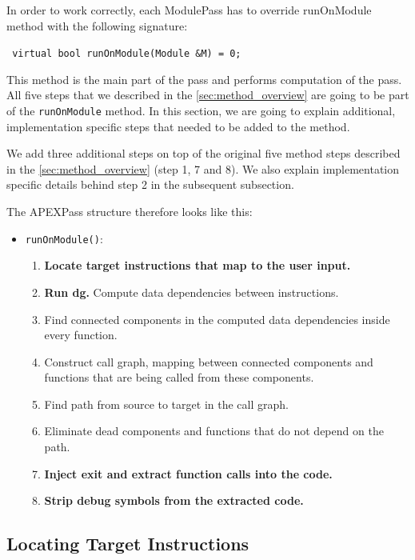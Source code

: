 \documentclass[12pt, twoside]{fithesis2}
\renewcommand{\_}{\leavevmode \kern0.07em\vbox{\hrule width0.4em}}
\newcommand{\squarebullet}{\textcolor{black}{\raisebox{0.15em}{\rule{4pt}{4pt}}}}
\newenvironment{myItemize}{
  \begin{itemize}[
    leftmargin=2em,
    rightmargin=1em,
    itemsep=\parskip,
    parsep=0em,
    topsep=0em,
    partopsep=0em
]
  \renewcommand{\labelitemi}{\squarebullet}
  \renewcommand{\labelitemii}{\textbullet}
}{
  \end{itemize}
}
\newenvironment{myEnumerate}{
  \begin{enumerate}[
    leftmargin=2em,
    rightmargin=1em,
    itemsep=\parskip,
    parsep=0em,
    topsep=0em,
    partopsep=0em
]
}{
  \end{enumerate}
}
\begin{document}
In order to work correctly, each ModulePass has to override runOnModule method
with the following signature:

\texttt{
virtual bool runOnModule(Module &M) = 0;
}

This method is the main part of the pass and performs computation of the pass.
All five steps that we described in the \autoref{sec:method_overview} are going
to be part of the \texttt{runOnModule} method.
In this section, we are going to explain
additional, implementation specific steps that needed to be added to
the method.

We add three additional steps on top of the original five method steps
described in the \autoref{sec:method_overview} (step 1, 7 and 8). We also
explain implementation specific details behind step 2 in the subsequent
subsection.

The APEXPass structure therefore looks like this:

\begin{myItemize}
\item{\texttt{runOnModule()}:}

\begin{myEnumerate}
\item{\textbf{Locate target instructions that map to the user input.}}
\item \textbf{Run dg.} Compute data dependencies between instructions.
\item Find connected components in the computed data dependencies inside
every function.
\item Construct call graph, mapping between connected components and functions
that are being called from these components.
\item Find path from source to target in the call graph.
\item Eliminate dead components and functions that do not depend on the path.
\item{\textbf{Inject exit and extract function calls into the code.}}
\item{\textbf{Strip debug symbols from the extracted code.}}
\end{myEnumerate}

\end{myItemize}


\subsection{Locating Target Instructions}
\label{sec:impl_inst_locate}
\end{document}
